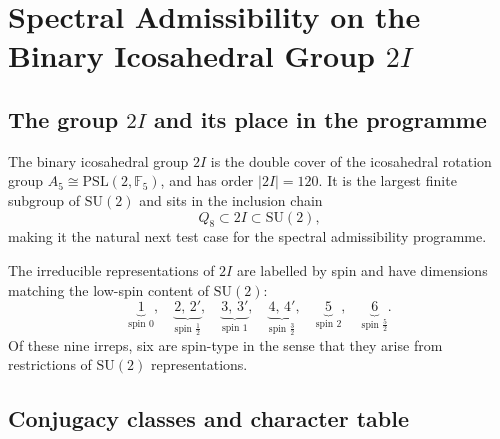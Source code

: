 \section{Spectral Admissibility on the Binary Icosahedral Group $2I$}
  \label{sec:step5}

  \subsection{The group $2I$ and its place in the programme}
    \label{sec:step5-intro}

    The binary icosahedral group $2I$ is the double cover of the icosahedral
    rotation group $A_5 \cong \mathrm{PSL}(2,\mathbb{F}_5)$, and has order
    $|2I| = 120$.
    It is the largest finite subgroup of $\mathrm{SU}(2)$ and sits in the
    inclusion chain
    \begin{equation}
      Q_8 \subset 2I \subset \mathrm{SU}(2),
      \label{eq:chain}
    \end{equation}
    making it the natural next test case for the spectral admissibility
    programme.

    The irreducible representations of $2I$ are labelled by spin and have
    dimensions matching the low-spin content of $\mathrm{SU}(2)$:
    \begin{equation}
      \underbrace{1}_{\text{spin }0},\quad
      \underbrace{2,\,2'}_{\text{spin }\tfrac{1}{2}},\quad
      \underbrace{3,\,3'}_{\text{spin }1},\quad
      \underbrace{4,\,4'}_{\text{spin }\tfrac{3}{2}},\quad
      \underbrace{5}_{\text{spin }2},\quad
      \underbrace{6}_{\text{spin }\tfrac{5}{2}}.
      \label{eq:2I-irreps}
    \end{equation}
    Of these nine irreps, six are spin-type in the sense that they arise from
    restrictions of $\mathrm{SU}(2)$ representations.

  \subsection{Conjugacy classes and character table}
    \label{sec:step5-chars}

